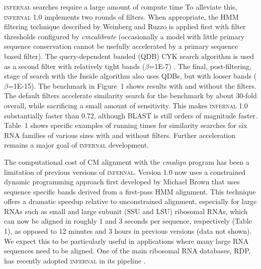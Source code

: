 \textsc{infernal} searches require a large amount of compute time To
alleviate this, \textsc{infernal} 1.0 implements two rounds of
filters.  When appropriate, the HMM filtering technique described by
Weinberg and Ruzzo \citep{WeinbergRuzzo06} is applied first with
filter thresholds configured by \emph{cmcalibrate} (occasionally a
model with little primary sequence conservation cannot be usefully
accelerated by a primary sequence based filter).  The query-dependent
banded (QDB) CYK search algorithm is used as a second filter with
relatively tight bands ($\beta$=1E-7) \citep{NawrockiEddy07}.  The
final, post-filtering, stage of search with the Inside algorithm also
uses QDBs, but with looser bands ($\beta$=1E-15).  The benchmark in
Figure~1 shows results with and without the filters. The default
filters accelerate similarity search for the benchmark by about
30-fold overall, while sacrificing a small amount of sensitivity. This
makes \textsc{infernal} 1.0 substantially faster than 0.72, although
\textsc{BLAST} is still orders of magnitude faster.  Table~1 shows
specific examples of running times for similarity searches for six RNA
families of various sizes with and without filters. 
Further acceleration remains a major goal of \textsc{infernal}
development.

The computational cost of CM alignment with the \emph{cmalign} program
has been a limitation of previous versions of
\textsc{infernal}. Version 1.0 now uses a constrained dynamic
programming approach first developed by Michael Brown \citep{Brown00}
that uses sequence specific bands derived from a first-pass HMM
alignment. This technique offers a dramatic speedup relative to
unconstrained alignment, especially for large RNAs such as small and
large subunit (SSU and LSU) ribosomal RNAs, which can now be aligned
in roughly 1 and 3 seconds per sequence, respectively (Table 1), as
opposed to 12 minutes and 3 hours in previous versions (data not
shown). We expect this to be particularly useful in applications where
many large RNA sequences need to be aligned. One of the main ribosomal
RNA databases, RDP, has recently adopted \textsc{infernal} in its
pipeline \citep{Cole09}.

